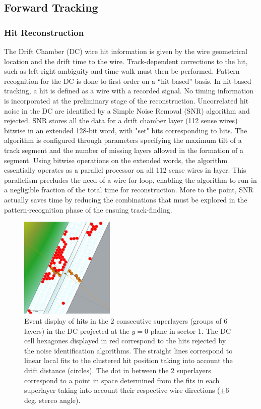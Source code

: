 \documentclass[3p,times,twocolumn]{elsarticle}
\begin{document}
\subsection{Forward Tracking}

\subsubsection{Hit Reconstruction}

The Drift Chamber (DC) wire hit information is given by the wire geometrical location and the drift time
to the wire. Track-dependent corrections to the hit, such as left-right ambiguity and time-walk must then
be performed. Pattern recognition for the DC is done to first order on a ``hit-based'' basis. In hit-based
tracking, a hit is defined as a wire with a recorded signal.  No timing information is incorporated at the
preliminary stage of the reconstruction.  Uncorrelated hit noise in the DC are identified by a Simple Noise
Removal (SNR) algorithm and rejected. SNR stores all the data for a drift chamber layer (112 sense wires)
bitwise in an extended 128-bit word, with "set" bits corresponding to hits. The algorithm is configured
through parameters specifying the maximum tilt of a track segment and the number of missing layers
allowed in the formation of a segment. Using bitwise operations on the extended words, the algorithm
essentially operates as a parallel processor on all 112 sense wires in layer. This parallelism precludes the
need of a wire for-loop, enabling the algorithm to run in a negligible fraction of the total time for
reconstruction. More to the point, SNR actually saves time by reducing the combinations that must be
explored in the pattern-recognition phase of the ensuing track-finding.
\begin{figure}
\includegraphics[width=0.4\textwidth,natwidth=610,natheight=642]{pics/dcTracks2.png}
\caption{Event display of hits in the 2 consecutive superlayers (groups of 6 layers) in the DC projected at the $y=0$ plane in sector 1.
The DC cell hexagones displayed in red correspond to the hits rejected by the noise
identification algorithms.  The straight lines correspond to linear local fits to the clustered hit
position taking into account the drift distance (circles). The dot in between the
2 superlayers correspond to a point in space determined from the fits in each superlayer taking into
account their respective wire directions ($\pm 6$ deg. stereo angle).
}
\label{fig:dcsegs}
\end{figure}
\end{document}
